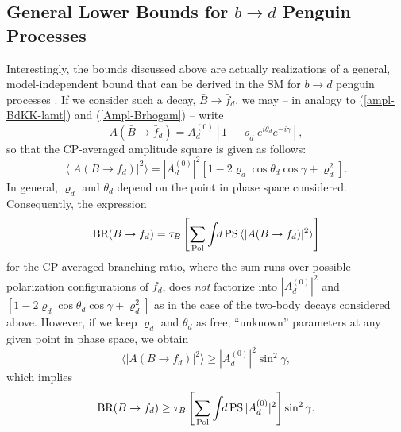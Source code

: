 \documentclass[12pt]{article}
\begin{document}
\subsection{General Lower Bounds for $b\to d$ Penguin Processes}
\unboldmath
%
%
%
Interestingly, the bounds discussed above are actually 
realizations of a general, model-independent bound that can be derived
in the SM for $b\to d$ penguin processes \cite{FR2}. If we consider such
a decay, $\bar B \to \bar f_d$, we may -- in analogy to (\ref{ampl-BdKK-lamt}) 
and (\ref{Ampl-Brhogam}) -- write
\begin{equation}
A(\bar B \to \bar f_d)= A^{(0)}_d
\left[1-\varrho_de^{i\theta_d}e^{-i\gamma}\right],
\end{equation}
so that the CP-averaged amplitude square is given as follows:
\begin{equation}
\langle|A(B \to f_d)|^2\rangle=|A^{(0)}_d|^2
\left[1-2\varrho_d\cos\theta_d\cos\gamma+\varrho_d^2\right].
\end{equation}
In general, $\varrho_d$ and $\theta_d$ depend on the point in phase space
considered. Consequently, the expression
\begin{equation}
\mbox{BR}(B \to f_d)=\tau_B\left[\sum_{\rm Pol}
\int \!\! d \, {\rm PS} \, \langle|A(B \to f_d)|^2\rangle \right]
\end{equation}
for the CP-averaged branching ratio, where the sum runs over possible
polarization configurations of $f_d$, does {\it not} factorize into 
$|A^{(0)}_d|^2$ and $[1-2\varrho_d\cos\theta_d\cos\gamma+\varrho_d^2]$ as 
in the case of the two-body decays considered above. However, if we 
keep $\varrho_d$ and $\theta_d$ as free, ``unknown'' parameters at any 
given point in phase space, we obtain
\begin{equation}
\langle|A(B \to f_d)|^2\rangle\geq|A^{(0)}_d|^2 \sin^2\gamma,
\end{equation}
which implies
\begin{equation}
\mbox{BR}(B \to f_d)\geq\tau_B\left[\sum_{\rm Pol}
\int \!\! d \, {\rm PS} \, |A^{(0)}_d|^2 \right]\sin^2\gamma.
\end{equation}
\end{document}
